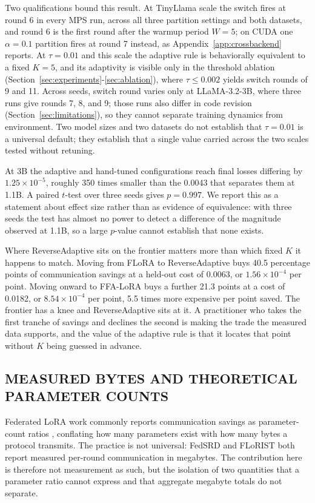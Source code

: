 Two qualifications bound this result. At TinyLlama scale the switch fires at round 6 in every MPS run, across all three partition settings and both datasets, and round 6 is the first round after the warmup period $W{=}5$; on CUDA one $\alpha{=}0.1$ partition fires at round 7 instead, as Appendix~\ref{app:crossbackend} reports. At $\tau{=}0.01$ and this scale the adaptive rule is behaviorally equivalent to a fixed $K{=}5$, and its adaptivity is visible only in the threshold ablation (Section~\ref{sec:experiments}-\ref{sec:ablation}), where $\tau \leq 0.002$ yields switch rounds of 9 and 11. Across seeds, switch round varies only at LLaMA-3.2-3B, where three runs give rounds 7, 8, and 9; those runs also differ in code revision (Section~\ref{sec:limitations}), so they cannot separate training dynamics from environment. Two model sizes and two datasets do not establish that $\tau{=}0.01$ is a universal default; they establish that a single value carried across the two scales tested without retuning.

At 3B the adaptive and hand-tuned configurations reach final losses differing by $1.25 \times 10^{-5}$, roughly 350 times smaller than the 0.0043 that separates them at 1.1B. A paired $t$-test over three seeds gives $p = 0.997$. We report this as a statement about effect size rather than as evidence of equivalence: with three seeds the test has almost no power to detect a difference of the magnitude observed at 1.1B, so a large $p$-value cannot establish that none exists.

Where ReverseAdaptive sits on the frontier matters more than which fixed $K$ it happens to match. Moving from FLoRA to ReverseAdaptive buys 40.5 percentage points of communication savings at a held-out cost of 0.0063, or $1.56 \times 10^{-4}$ per point. Moving onward to FFA-LoRA buys a further 21.3 points at a cost of 0.0182, or $8.54 \times 10^{-4}$ per point, 5.5 times more expensive per point saved. The frontier has a knee and ReverseAdaptive sits at it. A practitioner who takes the first tranche of savings and declines the second is making the trade the measured data supports, and the value of the adaptive rule is that it locates that point without $K$ being guessed in advance.

\subsection{MEASURED BYTES AND THEORETICAL PARAMETER COUNTS}
\label{sec:measuredbytes}
Federated LoRA work commonly reports communication savings as parameter-count ratios \cite{zhang2024federatedgpt,sun2024ffalora,wang2024flora,bai2024flexlora}, conflating how many parameters exist with how many bytes a protocol transmits. The practice is not universal: FedSRD \cite{yan2026fedsrd} and FLoRIST \cite{ramesh2026florist} both report measured per-round communication in megabytes. The contribution here is therefore not measurement as such, but the isolation of two quantities that a parameter ratio cannot express and that aggregate megabyte totals do not separate.

